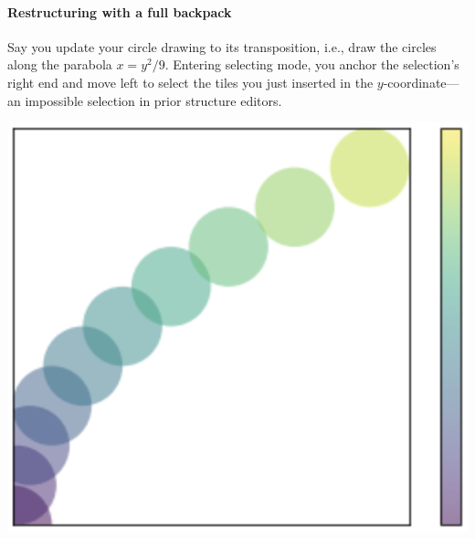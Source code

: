 \paragraph{Restructuring with a full backpack}
Say you update your circle drawing
to its transposition, i.e., draw the circles along
the parabola $x = y^2/9$.
Entering selecting mode, you anchor the selection's right
end and move left to select the tiles you just
inserted in the $y$-coordinate---an impossible
selection in prior structure editors.

\noindent
\begin{minipage}[t]{0.2\columnwidth}
  \includegraphics[width=\textwidth]{img/circles-parabola-transpose.png}
\end{minipage}
\hfill
